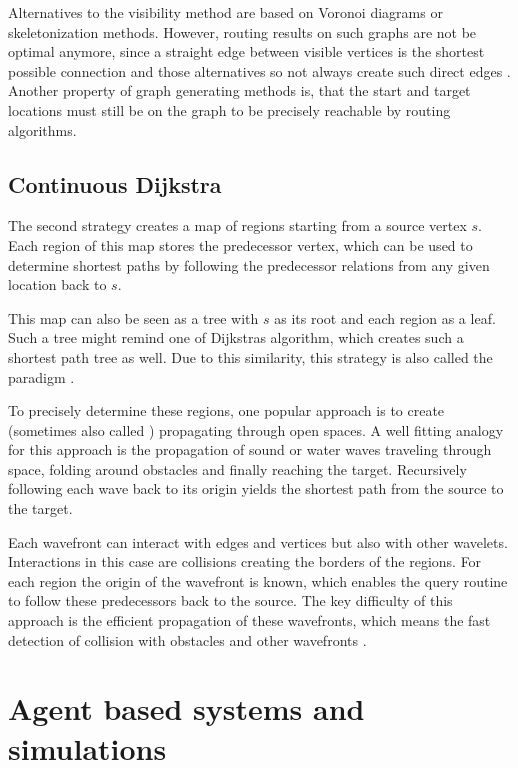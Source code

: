 		Alternatives to the visibility method are based on Voronoi diagrams or skeletonization methods.
		However, routing results on such graphs are not be optimal anymore, since a straight edge between visible vertices is the shortest possible connection and those alternatives so not always create such direct edges \cite{graser-osm-open-spaces}.
		Another property of graph generating methods is, that the start and target locations must still be on the graph to be precisely reachable by routing algorithms.
	
	\subsection{Continuous Dijkstra}
	\label{subsec:continuous-dijkstra}
	
		The second strategy creates a map of regions starting from a source vertex $s$.
		Each region of this map stores the predecessor vertex, which can be used to determine shortest paths by following the predecessor relations from any given location back to $s$.

		This map can also be seen as a tree with $s$ as its root and each region as a leaf.
		Such a tree might remind one of Dijkstras algorithm, which creates such a shortest path tree as well.
		Due to this similarity, this strategy is also called the  paradigm \cite{mitchell-discrete-geodesic}.
		
		To precisely determine these regions, one popular approach is to create  (sometimes also called ) propagating through open spaces.
		A well fitting analogy for this approach is the propagation of sound or water waves traveling through space, folding around obstacles and finally reaching the target.
		Recursively following each wave back to its origin yields the shortest path from the source to the target.
		
		Each wavefront can interact with edges and vertices but also with other wavelets.
		Interactions in this case are collisions creating the borders of the regions.
		For each region the origin of the wavefront is known, which enables the query routine to follow these predecessors back to the source.
		The key difficulty of this approach is the efficient propagation of these wavefronts, which means the fast detection of collision with obstacles and other wavefronts \cite{hershberger-suri}.

\section{Agent based systems and simulations}

